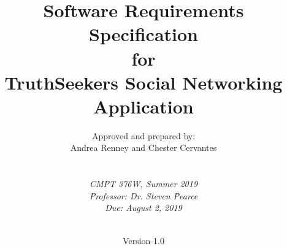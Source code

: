 \def\Company{SFU}
\def\Institute{\textit{CMPT 376W, Summer 2019}}
\def\Course{\textit{Professor: Dr. Steven Pearce}}
\def\Module{\textit{Due: August 2, 2019}}

\def\BoldTitle{Software Requirements Specification}

\def\Subtitle{for \\ TruthSeekers Social Networking Application \\}
\def\Authors{Approved and prepared by: \\ Andrea Renney and Chester Cervantes } 
\def\Shortname{us}

\title{\textbf{\BoldTitle}\\\Subtitle}
\author{\Authors \\ \\ \\ \Institute\\ \Course\\ \Module\\ \Docent\\ \Assistant}
\date{Version 1.0}

